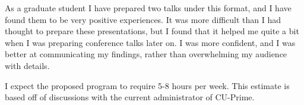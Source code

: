 \documentclass[12pt]{article}
\begin{document}
As a graduate student I have prepared two talks under this format, and I have found them to be very positive experiences. It was more difficult than I had thought to prepare these presentations, but I found that it helped me quite a bit when I was preparing conference talks later on. I was more confident, and I was better at communicating my findings, rather than overwhelming my audience with details. 

I expect the proposed program to require 5-8 hours per week. This estimate is based off of discussions with the current administrator of CU-Prime. 
\printbibliography
\end{document}
